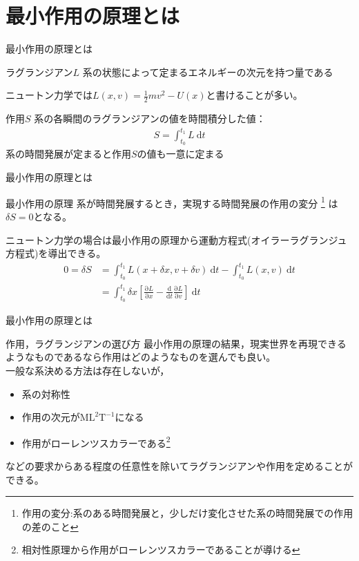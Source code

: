 \documentclass[unicode, aspectratio=169, 12pt]{beamer}
\newcommand{\diff}[2]{\frac{\mathrm{d} #1}{\mathrm{d} #2}} %
\newcommand{\pdiff}[2]{\frac{\mathrm{\partial} #1}{\mathrm{\partial} #2}} %
\begin{document}
\section{最小作用の原理とは}
\begin{frame}{最小作用の原理とは}
    \begin{block}{ラグランジアン$L$}
        系の状態によって定まるエネルギーの次元を持つ量である\\
    \end{block}
ニュートン力学では$L(x,v)=\frac{1}{2}m v^2 -U(x)$と書けることが多い。
    \begin{block}{作用$S$}
        系の各瞬間のラグランジアンの値を時間積分した値：
        \begin{align*}
            S = \int_{t_0}^{t_1} L \>\mathrm{d}t
        \end{align*}
        系の時間発展が定まると作用$S$の値も一意に定まる
    \end{block}
\end{frame}


\begin{frame}{最小作用の原理とは}
    \begin{block}{最小作用の原理}
        系が時間発展するとき，実現する時間発展の作用の変分
        \footnote{作用の変分:系のある時間発展と，少しだけ変化させた系の時間発展での作用の差のこと}
        は$\delta S=0$となる。
    \end{block}
ニュートン力学の場合は最小作用の原理から運動方程式(オイラーラグランジュ方程式)を導出できる。
\begin{align*}
    0 = \delta S
    &= \int_{t_0}^{t_1}L(x+\delta x, v + \delta v)\>\mathrm{d}t - \int_{t_0}^{t_1} L(x,v) \>\mathrm{d}t \\
    &= \int_{t_0}^{t_1} \delta x \left[\pdiff{L}{x}-\diff{}{t}\pdiff{L}{v}\right]\>\mathrm{d}t
\end{align*}
\end{frame}

\begin{frame}{最小作用の原理とは}
    \begin{block}{作用，ラグランジアンの選び方}
        最小作用の原理の結果，現実世界を再現できるようなものであるなら作用はどのようなものを選んでも良い。\\
        一般な系決める方法は存在しないが，
        \begin{itemize}
            \item 系の対称性
            \item 作用の次元が$\mathrm{ML^2T^{-1}}$になる
            \item 作用がローレンツスカラーである\footnote{相対性原理から作用がローレンツスカラーであることが導ける}
        \end{itemize}
        などの要求からある程度の任意性を除いてラグランジアンや作用を定めることができる。 %
    \end{block}
\end{frame}
\end{document}
